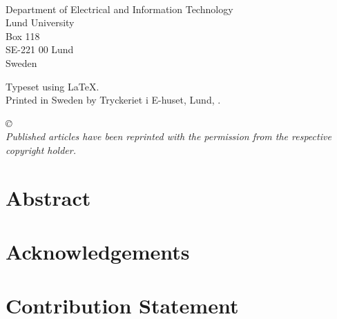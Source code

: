 \documentclass[11pt, twoside, openright]{book}
\theoremstyle{definition}
\newif\ifcontributionStatementOnly
\begin{document}
\begin{titlepage}
\begin{flushleft}
\theauthor\\
Department of Electrical and Information Technology\\
Lund University\\
Box 118\\
SE-221 00  Lund\\
Sweden\linebreak[2]


Typeset using \LaTeX.\\

Printed in Sweden by Tryckeriet i E-huset, Lund, \thedate.\linebreak[2]

\textit{\copyright ~\thedate~\theauthor\\
Published articles have been reprinted with the permission from the respective copyright holder.}
\vspace{10mm}
\end{flushleft}
\end{titlepage}

\newpage
\section*{Abstract}
\label{preamble:intro}


\cleardoublepage
\section*{Acknowledgements}
\label{preamble:acknowledgements}


\newpage

\fi  %
\section*{Contribution Statement}
\label{preamble:contributionstatement}


\ifcontributionStatementOnly
\else

\setcounter{tocdepth}{1}
\tableofcontents

\mainmatter
\end{document}
